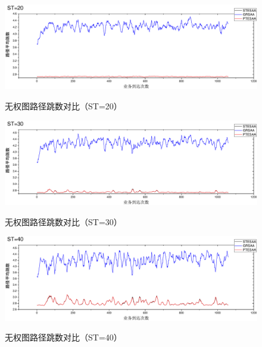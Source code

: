\begin{figure}
\vspace{-0.5cm}
\setlength{\abovecaptionskip}{-0.5cm}
\begin{center}
{\includegraphics[width=1 \textwidth]{figures/B20H.pdf}}
\end{center}
\caption{{\footnotesize{无权图路径跳数对比（ST=20）}}}
\label{B20H}
\end{figure}
\begin{figure}
\vspace{-0.5cm}
\setlength{\abovecaptionskip}{-0.5cm}
\begin{center}
{\includegraphics[width=1 \textwidth]{figures/B30H.pdf}}
\end{center}
\caption{{\footnotesize{无权图路径跳数对比（ST=30）}}}
\label{B20H}
\end{figure}
\begin{figure}
\vspace{-0.5cm}
\setlength{\abovecaptionskip}{-0.5cm}
\begin{center}
{\includegraphics[width=1 \textwidth]{figures/B40H.pdf}}
\end{center}
\caption{{\footnotesize{无权图路径跳数对比（ST=40）}}}
\label{B40H}
\end{figure}
